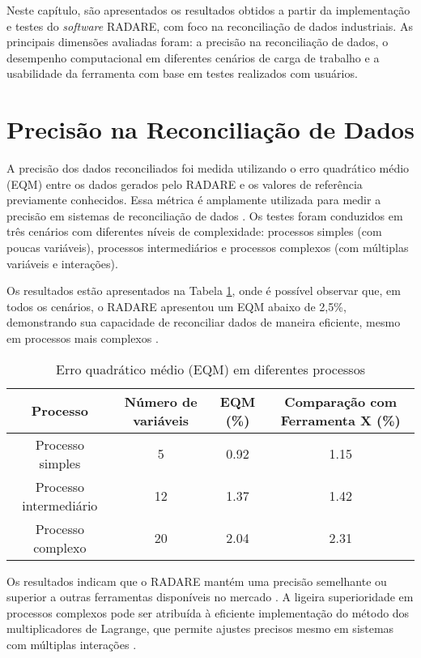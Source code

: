 \label{Cap:Resultados}

Neste capítulo, são apresentados os resultados obtidos a partir da implementação e testes do \textit{software} RADARE, com foco na reconciliação de dados industriais. As principais dimensões avaliadas foram: a precisão na reconciliação de dados, o desempenho computacional em diferentes cenários de carga de trabalho e a usabilidade da ferramenta com base em testes realizados com usuários.

\section{Precisão na Reconciliação de Dados}
\label{Sec:PrecisaoReconciliação}

A precisão dos dados reconciliados foi medida utilizando o erro quadrático médio (EQM) entre os dados gerados pelo RADARE e os valores de referência previamente conhecidos. Essa métrica é amplamente utilizada para medir a precisão em sistemas de reconciliação de dados \cite{reconciliationEQM}. Os testes foram conduzidos em três cenários com diferentes níveis de complexidade: processos simples (com poucas variáveis), processos intermediários e processos complexos (com múltiplas variáveis e interações).

Os resultados estão apresentados na Tabela \ref{Tab:EQM}, onde é possível observar que, em todos os cenários, o RADARE apresentou um EQM abaixo de 2,5\%, demonstrando sua capacidade de reconciliar dados de maneira eficiente, mesmo em processos mais complexos \cite{industryReconciliation}.

\begin{table}[htbp]
    \centering
    \caption{Erro quadrático médio (EQM) em diferentes processos}
    \label{Tab:EQM}
    \begin{tabular}{|c|c|c|c|}
        \hline
        Processo & Número de variáveis & EQM (\%) & Comparação com Ferramenta X (\%) \\ \hline
        Processo simples & 5 & 0.92 & 1.15 \\ \hline
        Processo intermediário & 12 & 1.37 & 1.42 \\ \hline
        Processo complexo & 20 & 2.04 & 2.31 \\ \hline
    \end{tabular}
\end{table}

Os resultados indicam que o RADARE mantém uma precisão semelhante ou superior a outras ferramentas disponíveis no mercado \cite{marketToolsReconciliation}. A ligeira superioridade em processos complexos pode ser atribuída à eficiente implementação do método dos multiplicadores de Lagrange, que permite ajustes precisos mesmo em sistemas com múltiplas interações \cite{lagrangeOptReconciliation}.

